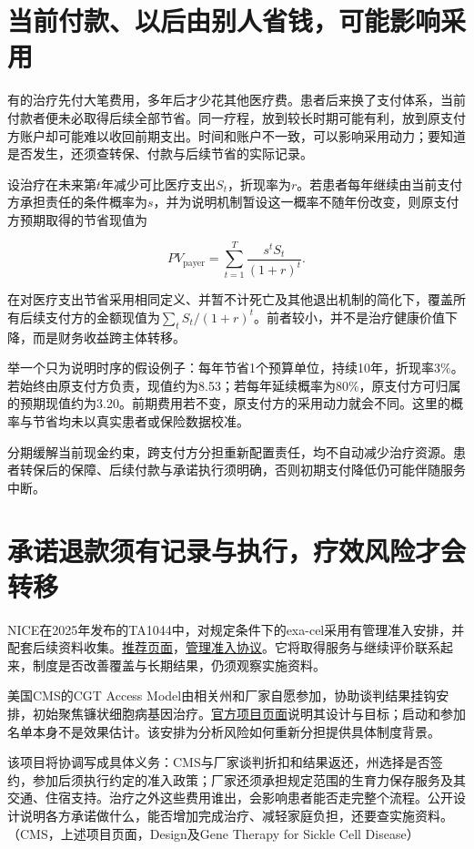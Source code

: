 \documentclass[UTF8,fontset=windows,12pt,a4paper,oneside,openany]{ctexbook}
\begin{document}
\section{当前付款、以后由别人省钱，可能影响采用}

有的治疗先付大笔费用，多年后才少花其他医疗费。患者后来换了支付体系，当前付款者便未必取得后续全部节省。同一疗程，放到较长时期可能有利，放到原支付方账户却可能难以收回前期支出。时间和账户不一致，可以影响采用动力；要知道是否发生，还须查转保、付款与后续节省的实际记录。

设治疗在未来第\(t\)年减少可比医疗支出\(S_t\)，折现率为\(r\)。若患者每年继续由当前支付方承担责任的条件概率为\(s\)，并为说明机制暂设这一概率不随年份改变，则原支付方预期取得的节省现值为

\[
PV_{\mathrm{payer}}=\sum_{t=1}^{T}\frac{s^t S_t}{(1+r)^t}.
\tag{11-4}
\]

在对医疗支出节省采用相同定义、并暂不计死亡及其他退出机制的简化下，覆盖所有后续支付方的金额现值为\(\sum_tS_t/(1+r)^t\)。前者较小，并不是治疗健康价值下降，而是财务收益跨主体转移。

举一个只为说明时序的假设例子：每年节省1个预算单位，持续10年，折现率3\%。若始终由原支付方负责，现值约为8.53；若每年延续概率为80\%，原支付方可归属的预期现值约为3.20。前期费用若不变，原支付方的采用动力就会不同。这里的概率与节省均未以真实患者或保险数据校准。

分期缓解当前现金约束，跨支付方分担重新配置责任，均不自动减少治疗资源。患者转保后的保障、后续付款与承诺执行须明确，否则初期支付降低仍可能伴随服务中断。

\section{承诺退款须有记录与执行，疗效风险才会转移}

NICE在2025年发布的TA1044中，对规定条件下的exa-cel采用有管理准入安排，并配套后续资料收集。\href{https://www.nice.org.uk/guidance/ta1044/chapter/1-recommendations}{推荐页面}，\href{https://www.nice.org.uk/guidance/ta1044/resources/managed-access-agreement-pdf-15250968973}{管理准入协议}。它将取得服务与继续评价联系起来，制度是否改善覆盖与长期结果，仍须观察实施资料。

美国CMS的CGT Access Model由相关州和厂家自愿参加，协助谈判结果挂钩安排，初始聚焦镰状细胞病基因治疗。\href{https://www.cms.gov/priorities/innovation/innovation-models/cgt}{官方项目页面}说明其设计与目标；启动和参加名单本身不是效果估计。该安排为分析风险如何重新分担提供具体制度背景。

该项目将协调写成具体义务：CMS与厂家谈判折扣和结果返还，州选择是否签约，参加后须执行约定的准入政策；厂家还须承担规定范围的生育力保存服务及其交通、住宿支持。治疗之外这些费用谁出，会影响患者能否走完整个流程。公开设计说明各方承诺做什么，能否增加完成治疗、减轻家庭负担，还要查实施资料。（CMS，上述项目页面，Design及Gene Therapy for Sickle Cell Disease）
\end{document}
